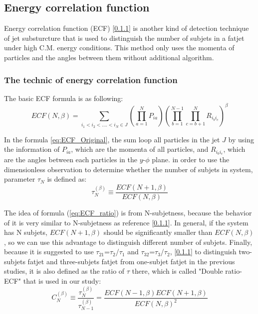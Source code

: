 \documentclass[12pt,twoside,a4paper,an,final]{cms-tdr}
\begin{document}
\subsection{Energy correlation function}
Energy correlation function (ECF) [\ref{}] is another kind of detection technique of jet substurcture that is used to distinguish the number of subjets in a fatjet under high C.M. energy conditions. This method only uses the momenta of particles and the angles between them without additional algorithm.\\
\subsubsection{The technic of energy correlation function}
The basic ECF formula is as following:\\
\begin{equation} \label{eq:ECF_Original}
ECF(N,\beta)=\sum_{i_{1}<i_{2}<....<i_{N}\in J} (\prod_{a=1}^{N}P_{ia})(\prod_{b=1}^{N-1}\prod_{c=b+1}^{N} R_{i_{b}i_{c}})^{\beta}
\end{equation}

In the formula \ref{eq:ECF_Original}, the sum loop all particles in the jet $J$ by using the information of $P_{ia}$, which are the momenta of all particles, and $R_{i_{b}i_{c}}$, which are the angles between each particles in the $y$-$\phi$ plane.  in order to use the dimensionless observation to determine whether the number of subjets in system, parameter $\tau_{N}$ is defined as:\\
\begin{equation} \label{eq:ECF_ratio}
\tau_{N}^{(\beta)}\equiv\frac{ECF(N+1,\beta)}{ECF(N,\beta)}
\end{equation}

The idea of formula (\ref{eq:ECF_ratio}) is from N-subjetness, because the behavior of it is very similar to N-subjetness as reference [\ref{}]. In general, if the system has N subjets, $ECF(N+1,\beta)$ should be significantly smaller than $ECF(N,\beta)$, so we can use this advantage to distinguish different number of subjets. Finally, because it is suggested to use $\tau_{21}$=$\tau_{2}$/$\tau_{1}$  and $\tau_{32}$=$\tau_{3}$/$\tau_{2}$, [\ref{}] to distinguish two-subjets fatjet and three-subjets fatjet from one-subjet fatjet in the previous studies, it is also defined as the ratio of $\tau$ there, which is called "Double ratio-ECF" that is used in our study:\\
\begin{equation}
C_{N}^{(\beta)}\equiv\frac{\tau_{N}^{(\beta)}}{\tau_{N-1}^{(\beta)}}=\frac{ECF(N-1,\beta)ECF(N+1,\beta)}{ECF(N,\beta)^2}
\end{equation}
\end{document}
